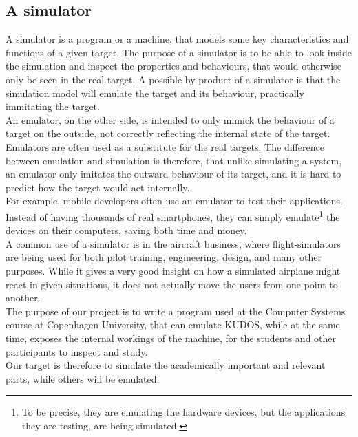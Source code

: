 \subsection{A simulator}
A simulator is a program or a machine, that models some key characteristics
and functions of a given target.  The purpose of a
simulator is to be able to look inside the simulation and inspect the properties
and behaviours, that would otherwise only be seen in the real target.
A possible by-product of a simulator is that the simulation model will emulate
the target and its behaviour, practically immitating the target.\\
An emulator, on the other side, is intended to only mimick the behaviour of
a target on the outside, not correctly reflecting the internal state of the target.
Emulators are often used as a substitute for the real targets.
The difference between emulation and simulation is therefore, that unlike simulating a system,
an emulator only imitates the outward behaviour of its target, and it is hard
to predict how the target would act internally.\\
For example, mobile developers often use an emulator to test their
applications.
Instead of having thousands of real smartphones, they can simply emulate\footnote{
To be precise, they are emulating the hardware devices, but the applications they
are testing, are being simulated.}
the devices on their computers, saving both time and money.\\
A common use of a simulator is in the aircraft business, where flight-simulators
are being used for both pilot training, engineering, design, and many other
purposes. While it gives a very good insight on how a simulated airplane might
react in given situations, it does not actually move the users from one point
to another.\\
The purpose of our project is to write a program used at the Computer Systems
course at Copenhagen University, that can emulate KUDOS, while at the same
time, exposes the internal workings of the machine, for the students and
other participants to inspect and study.\\
Our target is therefore to simulate the academically important and relevant
parts, while others will be emulated.

